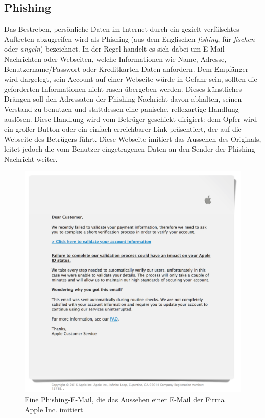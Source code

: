 \subsection{Phishing}
\label{sub:phishing}

Das Bestreben, persönliche Daten im Internet durch ein gezielt verfälschtes
Auftreten abzugreifen wird als Phishing (aus dem Englischen \emph{fishing}, für
\emph{fischen} oder \emph{angeln}) bezeichnet. In der Regel handelt es sich
dabei um E-Mail-Nachrichten oder Webseiten, welche Informationen wie Name,
Adresse, Benutzername/Passwort oder Kreditkarten-Daten anfordern. Dem Empfänger
wird dargelegt, sein Account auf einer Webseite würde in Gefahr sein, sollten
die geforderten Informationen nicht rasch übergeben werden. Dieses künstliches
Drängen soll den Adressaten der Phishing-Nachricht davon abhalten, seinen
Verstand zu benutzen und stattdessen eine panische, reflexartige Handlung
auslösen. Diese Handlung wird vom Betrüger geschickt dirigiert: dem Opfer wird
ein großer Button oder ein einfach erreichbarer Link präsentiert, der auf die
Webseite des Betrügers führt. Diese Webseite imitiert das Aussehen des
Originals, leitet jedoch die vom Benutzer eingetragenen Daten an den Sender der
Phishing-Nachricht weiter.

\begin{figure}
  \centering
  \includegraphics[scale=0.5]{Resources/phishing-apple}
  \caption{Eine Phishing-E-Mail, die das Aussehen einer E-Mail der Firma Apple Inc. imitiert}
  \label{fig:phishing-apple}
\end{figure}

